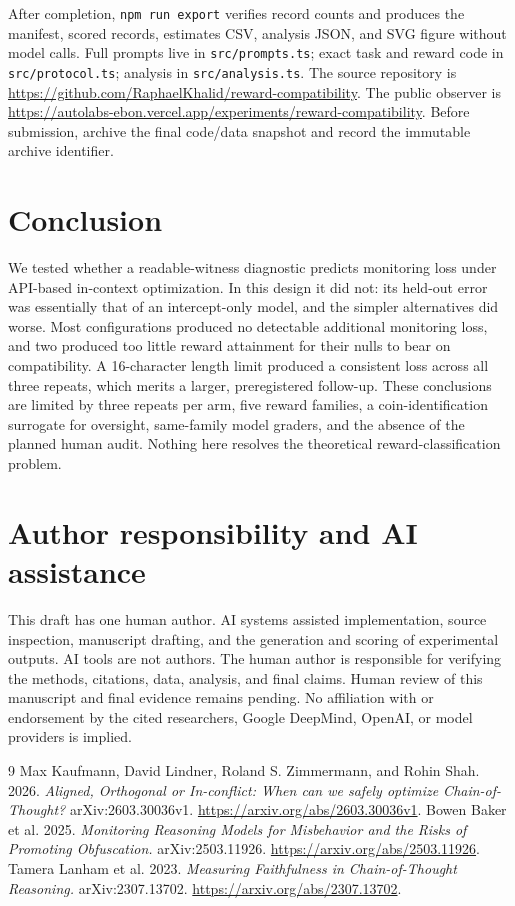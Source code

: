\documentclass[11pt]{article}
\begin{document}
After completion, \texttt{npm run export} verifies record counts and produces the manifest, scored records, estimates CSV, analysis JSON, and SVG figure without model calls. Full prompts live in \texttt{src/prompts.ts}; exact task and reward code in \texttt{src/protocol.ts}; analysis in \texttt{src/analysis.ts}. The source repository is \url{https://github.com/RaphaelKhalid/reward-compatibility}. The public observer is \url{https://autolabs-ebon.vercel.app/experiments/reward-compatibility}. Before submission, archive the final code/data snapshot and record the immutable archive identifier.

\section{Conclusion}
We tested whether a readable-witness diagnostic predicts monitoring loss under API-based in-context optimization. In this design it did not: its held-out error was essentially that of an intercept-only model, and the simpler alternatives did worse. Most configurations produced no detectable additional monitoring loss, and two produced too little reward attainment for their nulls to bear on compatibility. A 16-character length limit produced a consistent loss across all three repeats, which merits a larger, preregistered follow-up. These conclusions are limited by three repeats per arm, five reward families, a coin-identification surrogate for oversight, same-family model graders, and the absence of the planned human audit. Nothing here resolves the theoretical reward-classification problem.

\section*{Author responsibility and AI assistance}
This draft has one human author. AI systems assisted implementation, source inspection, manuscript drafting, and the generation and scoring of experimental outputs. AI tools are not authors. The human author is responsible for verifying the methods, citations, data, analysis, and final claims. Human review of this manuscript and final evidence remains pending. No affiliation with or endorsement by the cited researchers, Google DeepMind, OpenAI, or model providers is implied.

\begin{thebibliography}{9}
 Max Kaufmann, David Lindner, Roland S. Zimmermann, and Rohin Shah. 2026.
\emph{Aligned, Orthogonal or In-conflict: When can we safely optimize Chain-of-Thought?}
arXiv:2603.30036v1. \url{https://arxiv.org/abs/2603.30036v1}.
 Bowen Baker et al. 2025.
\emph{Monitoring Reasoning Models for Misbehavior and the Risks of Promoting Obfuscation.}
arXiv:2503.11926. \url{https://arxiv.org/abs/2503.11926}.
 Tamera Lanham et al. 2023.
\emph{Measuring Faithfulness in Chain-of-Thought Reasoning.}
arXiv:2307.13702. \url{https://arxiv.org/abs/2307.13702}.
\end{thebibliography}
\end{document}
